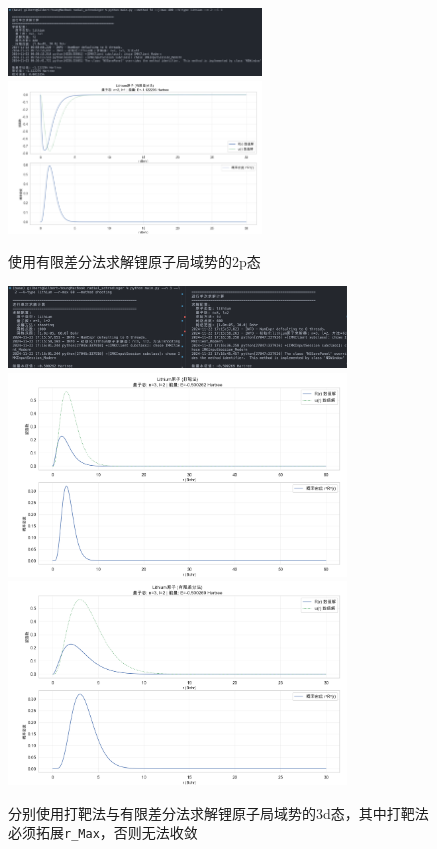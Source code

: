 \begin{figure}[H]
    \centering
    \includegraphics[width=0.6\textwidth]{Problem_2/figs/li_fd_2p_terminal.png}
    \includegraphics[width=0.6\textwidth]{Problem_2/figs/li_fd_2p.png}
    \caption{使用有限差分法求解锂原子局域势的2p态}
\end{figure}

\begin{figure}[H]
    \centering
    \includegraphics[width=0.8\textwidth]{Problem_2/figs/li_sh&fd_3d_terminal.png}
    \includegraphics[width=0.8\textwidth]{Problem_2/figs/li_shooting_3d.png}
    \includegraphics[width=0.8\textwidth]{Problem_2/figs/li_fd_3d.png}
    \caption{分别使用打靶法与有限差分法求解锂原子局域势的3d态，其中打靶法必须拓展\texttt{r\_Max}，否则无法收敛}
\end{figure}
